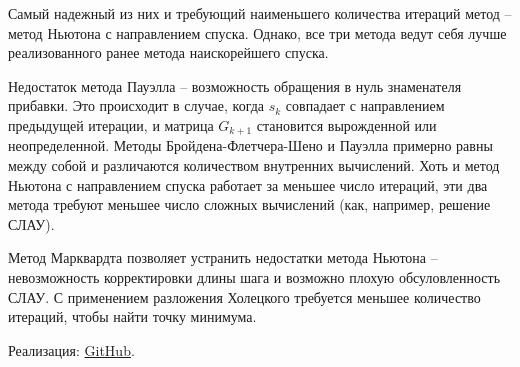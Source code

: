 \documentclass[12pt]{article}
\begin{document}
Самый надежный из них и требующий наименьшего количества итераций метод -- метод Ньютона с направлением спуска. Однако, все три метода ведут себя лучше реализованного ранее метода наискорейшего спуска.

Недостаток метода Пауэлла -- возможность обращения в нуль знаменателя прибавки. Это происходит в случае, когда $s_k$ совпадает с направлением предыдущей итерации, и матрица $G_{k+1}$ становится вырожденной или неопределенной. Методы Бройдена-Флетчера-Шено и Пауэлла примерно равны между собой и различаются количеством внутренних вычислений. Хоть и метод Ньютона с направлением спуска работает за меньшее число итераций, эти два метода требуют меньшее число сложных вычислений (как, например, решение СЛАУ).

Метод Марквардта позволяет устранить недостатки метода Ньютона -- невозможность корректировки длины шага и возможно плохую обсуловленность СЛАУ. С применением разложения Холецкого требуется меньшее количество итераций, чтобы найти точку минимума.

Реализация: \href{https://github.com/Mr3zee/Newton-Optimization}{GitHub}.
\end{document}
